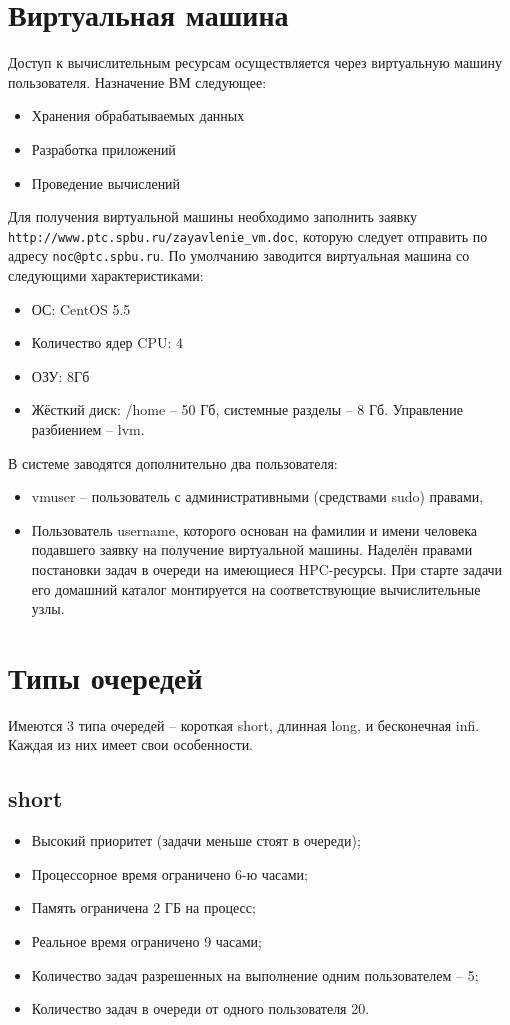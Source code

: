 \documentclass[a4paper,8pt]{extreport}
\begin{document}
\section{Виртуальная машина}
Доступ к вычислительным ресурсам осуществляется через виртуальную машину пользователя. Назначение ВМ следующее:
\begin{itemize}
  \item Хранения обрабатываемых данных
  \item Разработка приложений
  \item Проведение вычислений
\end{itemize}
Для получения виртуальной машины необходимо заполнить заявку \verb*|http://www.ptc.spbu.ru/zayavlenie_vm.doc|, 
которую следует отправить по адресу \verb*|noc@ptc.spbu.ru|.
По умолчанию заводится виртуальная машина со следующими характеристиками:
\begin{itemize}
  \item ОС: CentOS 5.5
  \item Количество ядер CPU: 4
  \item ОЗУ: 8Гб
  \item Жёсткий диск: /home -- 50 Гб, системные разделы -- 8 Гб. Управление разбиением -- lvm.
\end{itemize}
В системе заводятся дополнительно два пользователя: 
\begin{itemize}
  \item vmuser -- пользователь с административными (средствами sudo) правами, 
  \item Пользователь username, которого основан на фамилии и имени человека подавшего заявку на получение 
  виртуальной машины. Наделён правами постановки задач в очереди на имеющиеся HPC-ресурсы. При старте задачи его 
домашний каталог монтируется на соответствующие вычислительные узлы.
\end{itemize}

\section{Типы очередей}
Имеются 3 типа очередей -- короткая short, длинная long, и бесконечная infi. Каждая из них имеет свои особенности.

\subsection{short}
\begin{itemize}
  \item Высокий приоритет (задачи меньше стоят в очереди);
  \item Процессорное время ограничено 6-ю часами;
  \item Память ограничена 2 ГБ на процесс;
  \item Реальное время ограничено 9 часами;
  \item Количество задач разрешенных на выполнение одним пользователем -- 5;
  \item Количество задач в очереди от одного пользователя 20.
\end{itemize}
\end{document}

